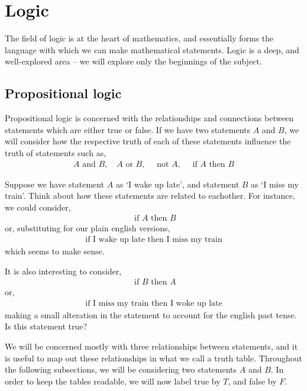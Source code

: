 \chapter{Logic}

The field of logic is at the heart of mathematics, and essentially forms the language with which we can make mathematical statements. Logic is a deep, and well-explored area -- we will explore only the beginnings of the subject.

\section{Propositional logic}
Propositional logic is concerned with the relationships and connections between statements which are either true or false. If we have two statements $ A $ and $ B $, we will consider how the respective truth of each of these statements influence the truth of statements such as,
\begin{align*}
	A \text{ and } B, \quad A \text{ or } B, \quad \text{ not } A, \quad \text{ if } A \text{ then } B
\end{align*}

\begin{example}
	Suppose we have statement $ A $ as `I wake up late', and statement $ B $ as `I miss my train'. Think about how these statements are related to eachother. For instance, we could consider,
	\begin{align*}
		\text{ if } A \text{ then } B
	\end{align*}
	or, substituting for our plain english versions,
	\begin{align*}
		\text{ if I wake up late then I miss my train }
	\end{align*}
	which seems to make sense.

	It is also interesting to consider,
	\begin{align*}
		\text{ if } B \text{ then } A
	\end{align*}
	or,
	\begin{align*}
		\text{ if I miss my train then I woke up late }
	\end{align*}
	making a small alteration in the statement to account for the english past tense. Is this statement true?
\end{example}

We will be concerned mostly with three relationships between statements, and it is useful to map out these relationships in what we call a truth table. Throughout the following subsections, we will be considering two statements $ A $ and $ B $. In order to keep the tables readable, we will now label true by $ T $, and false by $ F $.

